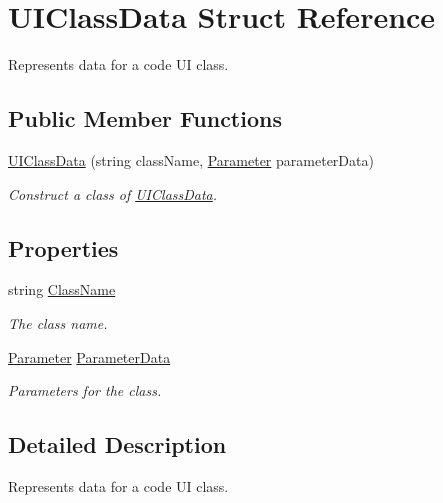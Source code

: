 \hypertarget{struct_u_i_class_data}{}\section{U\+I\+Class\+Data Struct Reference}
\label{struct_u_i_class_data}


Represents data for a code UI class.  


\subsection*{Public Member Functions}
\begin{DoxyCompactItemize}
\item 
\hyperlink{struct_u_i_class_data_afbef721e15c3ef0806b293d53f1f59ae}{U\+I\+Class\+Data} (string class\+Name, \hyperlink{class_parameter}{Parameter} parameter\+Data)
\begin{DoxyCompactList}\small\item\em Construct a class of \hyperlink{struct_u_i_class_data}{U\+I\+Class\+Data}. \end{DoxyCompactList}\end{DoxyCompactItemize}
\subsection*{Properties}
\begin{DoxyCompactItemize}
\item 
string \hyperlink{struct_u_i_class_data_adb8a79a22e09f9941eb1aa24aebf9c88}{Class\+Name}
\begin{DoxyCompactList}\small\item\em The class name. \end{DoxyCompactList}\item 
\hyperlink{class_parameter}{Parameter} \hyperlink{struct_u_i_class_data_ae0a500c9d9c89a202b3d18e20eb71e0b}{Parameter\+Data}
\begin{DoxyCompactList}\small\item\em Parameters for the class. \end{DoxyCompactList}\end{DoxyCompactItemize}


\subsection{Detailed Description}
Represents data for a code UI class. 



